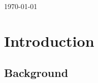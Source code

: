 \documentclass[12pt, a4paper, openright, twoside, final]{memoir}
\begin{document}
\begin{titlingpage}

{\large \today}\\[3cm] %


\vfill %

\end{titlingpage}

\tableofcontents*
\chapter{Introduction}
\section{Background}

\printbibliography
\end{document}
